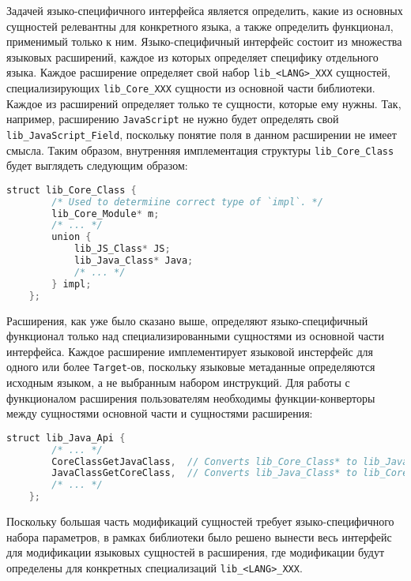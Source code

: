 Задачей языко-специфичного интерфейса является определить, какие из основных сущностей релевантны для конкретного языка, а также определить функционал, применимый только к ним. Языко-специфичный интерфейс состоит из множества языковых расширений, каждое из которых определяет специфику отдельного языка. Каждое расширение определяет свой набор \texttt{lib\_<LANG>\_XXX} сущностей, специализирующих \texttt{lib\_Core\_XXX} сущности из основной части библиотеки. Каждое из расширений определяет только те сущности, которые ему нужны. Так, например, расширению \texttt{JavaScript} не нужно будет определять свой \texttt{lib\_JavaScript\_Field}, поскольку понятие поля в данном расширении не имеет смысла. Таким образом, внутренняя имплементация структуры \texttt{lib\_Core\_Class} будет выглядеть следующим образом:

\begin{lstlisting}[language=Java, caption=Внутренняя имплементация типа \texttt{lib\_Core\_Class}, label=lst:libClass]
    struct lib_Core_Class {
        /* Used to determiine correct type of `impl`. */
        lib_Core_Module* m;
        /* ... */
        union {
            lib_JS_Class* JS;
            lib_Java_Class* Java;
            /* ... */
        } impl;
    };
\end{lstlisting}

Расширения, как уже было сказано выше, определяют языко-специфичный функционал только над специализированными сущностями из основной части интерфейса. Каждое расширение имплементирует языковой инстерфейс для одного или более \texttt{Target}-ов, поскольку языковые метаданные определяются исходным языком, а не выбранным набором инструкций. Для работы с функционалом расширения пользователям необходимы функции-конверторы между сущностями основной части и сущностями расширения:

\begin{lstlisting}[language=Java, caption=Пример функций-конверторов., label=lst:libConvertors]
    struct lib_Java_Api {
        /* ... */
        CoreClassGetJavaClass,  // Converts lib_Core_Class* to lib_Java_Class*
        JavaClassGetCoreClass,  // Converts lib_Java_Class* to lib_Core_Class*
        /* ... */
    };
\end{lstlisting}

Поскольку большая часть модификаций сущностей требует языко-специфичного набора параметров, в рамках библиотеки было решено вынести весь интерфейс для модификации языковых сущностей в расширения, где модификации будут определены для конкретных специализаций \texttt{lib\_<LANG>\_XXX}.

